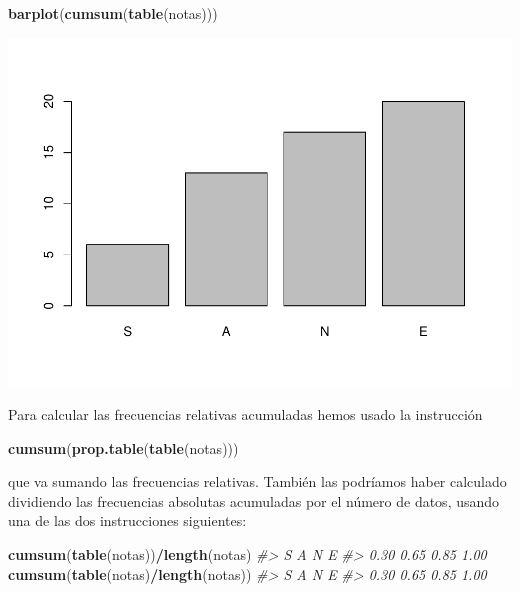 \documentclass[
]{book}
\newenvironment{Shaded}{\begin{snugshade}}{\end{snugshade}}
\newcommand{\CommentTok}[1]{\textcolor[rgb]{0.56,0.35,0.01}{\textit{#1}}}
\newcommand{\KeywordTok}[1]{\textcolor[rgb]{0.13,0.29,0.53}{\textbf{#1}}}
\newcommand{\NormalTok}[1]{#1}
\newcommand{\OperatorTok}[1]{\textcolor[rgb]{0.81,0.36,0.00}{\textbf{#1}}}
\theoremstyle{definition}
\theoremstyle{definition}
\theoremstyle{definition}
\theoremstyle{remark}
\begin{document}
\begin{Shaded}
\begin{Highlighting}[]
\KeywordTok{barplot}\NormalTok{(}\KeywordTok{cumsum}\NormalTok{(}\KeywordTok{table}\NormalTok{(notas)))}
\end{Highlighting}
\end{Shaded}

\begin{center}\includegraphics[width=0.9\linewidth]{11chap11_Descripcion_ordinales_files/figure-latex/unnamed-chunk-6-1} \end{center}

Para calcular las frecuencias relativas acumuladas hemos usado la instrucción

\begin{Shaded}
\begin{Highlighting}[]
\KeywordTok{cumsum}\NormalTok{(}\KeywordTok{prop.table}\NormalTok{(}\KeywordTok{table}\NormalTok{(notas)))}
\end{Highlighting}
\end{Shaded}

que va sumando las frecuencias relativas. También las podríamos haber calculado dividiendo las frecuencias
absolutas acumuladas por el número de datos, usando una de las dos instrucciones siguientes:

\begin{Shaded}
\begin{Highlighting}[]
\KeywordTok{cumsum}\NormalTok{(}\KeywordTok{table}\NormalTok{(notas))}\OperatorTok{/}\KeywordTok{length}\NormalTok{(notas)}
\CommentTok{\#\textgreater{}    S    A    N    E }
\CommentTok{\#\textgreater{} 0.30 0.65 0.85 1.00}
\KeywordTok{cumsum}\NormalTok{(}\KeywordTok{table}\NormalTok{(notas)}\OperatorTok{/}\KeywordTok{length}\NormalTok{(notas))}
\CommentTok{\#\textgreater{}    S    A    N    E }
\CommentTok{\#\textgreater{} 0.30 0.65 0.85 1.00}
\end{Highlighting}
\end{Shaded}
\end{document}
